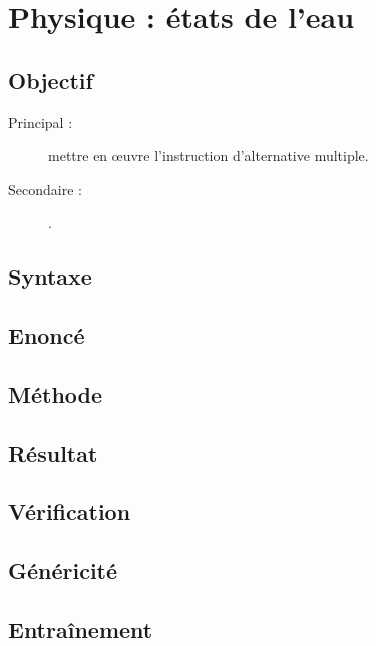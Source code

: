 \section{Physique : états de l'eau}

\subsection{Objectif}\label{tests:physique:objectif}
\begin{description}
\item[Principal : ] mettre en \oe uvre l'instruction d'alternative multiple.
\item[Secondaire :] .
\end{description}

\subsection{Syntaxe \python}\label{tests:physique:python}

\subsection{Enoncé}\label{tests:physique:enonce}


\subsection{Méthode}\label{tests:physique:methode}

\subsection{Résultat}\label{tests:physique:resultat}

\subsection{Vérification}\label{tests:physique:verification}

\subsection{Généricité}\label{tests:physique:genericite}

\subsection{Entraînement}\label{tests:physique:entrainement}

